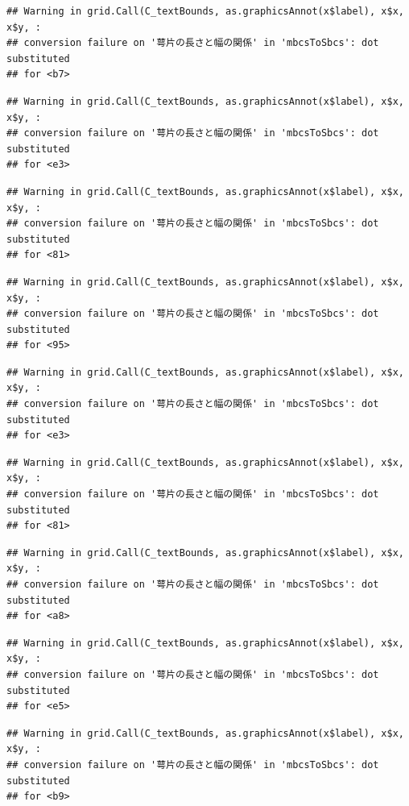 \documentclass[
]{book}
\begin{document}
\begin{verbatim}
## Warning in grid.Call(C_textBounds, as.graphicsAnnot(x$label), x$x, x$y, :
## conversion failure on '萼片の長さと幅の関係' in 'mbcsToSbcs': dot substituted
## for <b7>
\end{verbatim}

\begin{verbatim}
## Warning in grid.Call(C_textBounds, as.graphicsAnnot(x$label), x$x, x$y, :
## conversion failure on '萼片の長さと幅の関係' in 'mbcsToSbcs': dot substituted
## for <e3>
\end{verbatim}

\begin{verbatim}
## Warning in grid.Call(C_textBounds, as.graphicsAnnot(x$label), x$x, x$y, :
## conversion failure on '萼片の長さと幅の関係' in 'mbcsToSbcs': dot substituted
## for <81>
\end{verbatim}

\begin{verbatim}
## Warning in grid.Call(C_textBounds, as.graphicsAnnot(x$label), x$x, x$y, :
## conversion failure on '萼片の長さと幅の関係' in 'mbcsToSbcs': dot substituted
## for <95>
\end{verbatim}

\begin{verbatim}
## Warning in grid.Call(C_textBounds, as.graphicsAnnot(x$label), x$x, x$y, :
## conversion failure on '萼片の長さと幅の関係' in 'mbcsToSbcs': dot substituted
## for <e3>
\end{verbatim}

\begin{verbatim}
## Warning in grid.Call(C_textBounds, as.graphicsAnnot(x$label), x$x, x$y, :
## conversion failure on '萼片の長さと幅の関係' in 'mbcsToSbcs': dot substituted
## for <81>
\end{verbatim}

\begin{verbatim}
## Warning in grid.Call(C_textBounds, as.graphicsAnnot(x$label), x$x, x$y, :
## conversion failure on '萼片の長さと幅の関係' in 'mbcsToSbcs': dot substituted
## for <a8>
\end{verbatim}

\begin{verbatim}
## Warning in grid.Call(C_textBounds, as.graphicsAnnot(x$label), x$x, x$y, :
## conversion failure on '萼片の長さと幅の関係' in 'mbcsToSbcs': dot substituted
## for <e5>
\end{verbatim}

\begin{verbatim}
## Warning in grid.Call(C_textBounds, as.graphicsAnnot(x$label), x$x, x$y, :
## conversion failure on '萼片の長さと幅の関係' in 'mbcsToSbcs': dot substituted
## for <b9>
\end{verbatim}
\end{document}
